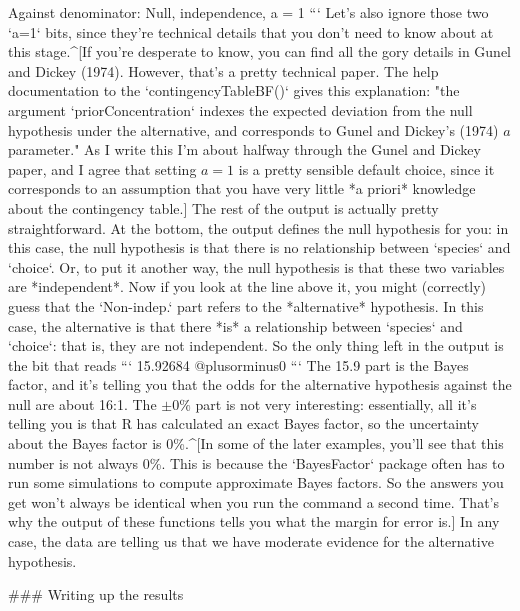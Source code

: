 Against denominator:
  Null, independence, a = 1 
```
Let's also ignore those two `a=1` bits, since they're technical details that you don't need to know about at this stage.^[If you're desperate to know, you can find all the gory details in Gunel and Dickey (1974). However, that's a pretty technical paper. The help documentation to the `contingencyTableBF()` gives this explanation: "the argument `priorConcentration` indexes the expected deviation from the null hypothesis under the alternative, and corresponds to Gunel and Dickey's (1974) $a$ parameter." As I write this I'm about halfway through the Gunel and Dickey paper, and I agree that setting $a=1$ is a pretty sensible default choice, since it corresponds to an assumption that you have very little *a priori* knowledge about  the contingency table.] The rest of the output is actually pretty straightforward. At the bottom, the output defines the null hypothesis for you: in this case, the null hypothesis is that there is no relationship between `species` and `choice`. Or, to put it another way, the null hypothesis is that these two variables are *independent*. Now if you look at the line above it, you might (correctly) guess that the `Non-indep.` part refers to the *alternative* hypothesis. In this case, the alternative is that there *is* a relationship between `species` and `choice`: that is, they are not independent. So the only thing left in the output is the bit that reads
``` 
15.92684 @plusorminus0%
```
The 15.9 part is the Bayes factor, and it's telling you that the odds for the alternative hypothesis against the null are about 16:1. The $\pm0\%$ part is not very interesting: essentially, all it's telling you is that R has calculated an exact Bayes factor, so the uncertainty about the Bayes factor is 0\%.^[In some of the later examples, you'll see that this number is not always 0\%. This is because the `BayesFactor` package often has to run some simulations to compute approximate Bayes factors. So the answers you get won't always be identical when you run the command a second time. That's why the output of these functions tells you what the margin for error is.] In any case, the data are telling us that we have moderate evidence for the alternative hypothesis. 


### Writing up the results

